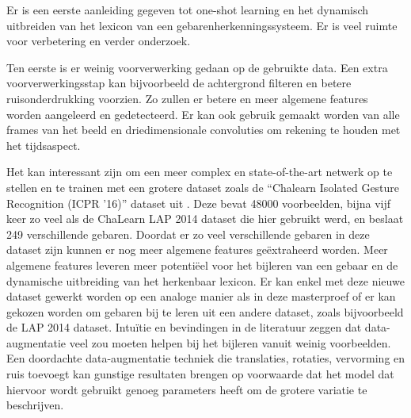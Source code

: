 Er is een eerste aanleiding gegeven tot one-shot learning en het dynamisch uitbreiden van het lexicon van een gebarenherkenningssysteem. Er is veel ruimte voor verbetering en verder onderzoek.

\npar Ten eerste is er weinig voorverwerking gedaan op de gebruikte data. Een extra voorverwerkingsstap kan bijvoorbeeld de achtergrond filteren en betere ruisonderdrukking voorzien. Zo zullen er betere en meer algemene features worden aangeleerd en gedetecteerd. Er kan ook gebruik gemaakt worden van alle frames van het beeld en driedimensionale convoluties om rekening te houden met het tijdsaspect.

\npar Het kan interessant zijn om een meer complex en state-of-the-art netwerk op te stellen en te trainen met een grotere dataset zoals de ``Chalearn Isolated Gesture Recognition (ICPR '16)'' dataset uit \cite{wan_chalearn_2016}. Deze bevat 48000 voorbeelden, bijna vijf keer zo veel als de ChaLearn LAP 2014 dataset die hier gebruikt werd, en beslaat 249 verschillende gebaren. Doordat er zo veel verschillende gebaren in deze dataset zijn kunnen er nog meer algemene features ge\"extraheerd worden. Meer algemene features leveren meer potenti\"eel voor het bijleren van een gebaar en de dynamische uitbreiding van het herkenbaar lexicon.
\npar Er kan enkel met deze nieuwe dataset gewerkt worden op een analoge manier als in deze masterproef of er kan gekozen worden om gebaren bij te leren uit een andere dataset, zoals bijvoorbeeld de LAP 2014 dataset.
\npar Intu\"itie en bevindingen in de literatuur zeggen dat data-augmentatie veel zou moeten helpen bij het bijleren vanuit weinig voorbeelden. Een doordachte data-augmentatie techniek die translaties, rotaties, vervorming en ruis toevoegt kan gunstige resultaten brengen op voorwaarde dat het model dat hiervoor wordt gebruikt genoeg parameters heeft om de grotere variatie te beschrijven.